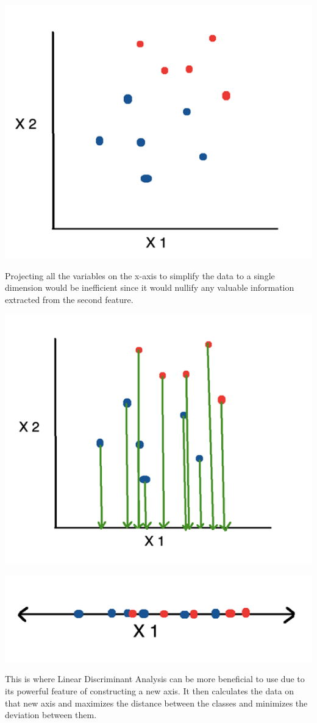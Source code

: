 \documentclass[a4paper,12pt]{report}
\begin{document}
\begin{center}
    \captionsetup{type=figure}
    \includegraphics[width=.5\linewidth]{media/LDAGraph.png}
\end{center}

Projecting all the variables on the x-axis to simplify the data to a single dimension would be inefficient since it would nullify any valuable information extracted from the second feature.

\begin{center}
    \captionsetup{type=figure}
    \includegraphics[width=.5\linewidth]{media/LDAgraph2.png}
\end{center}

\begin{center}
    \captionsetup{type=figure}
    \includegraphics[width=.5\linewidth]{media/LDAgraph3.png}
\end{center}

This is where Linear Discriminant Analysis can be more beneficial to use due to its powerful feature of constructing a new axis. It then calculates the data on that new axis and maximizes the distance between the classes and minimizes the deviation between them. 
\end{document}
